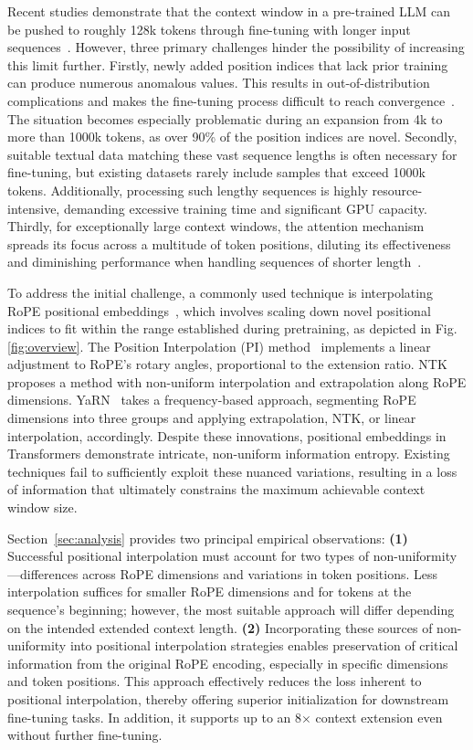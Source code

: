 Recent studies demonstrate that the context window in a pre-trained LLM can be pushed to roughly 128k tokens through fine-tuning with longer input sequences~\cite{longlora,pi,yarn,zhang2024soaring,liu2023scaling}. However, three primary challenges hinder the possibility of increasing this limit further. Firstly, newly added position indices that lack prior training can produce numerous anomalous values. This results in out-of-distribution complications and makes the fine-tuning process difficult to reach convergence~\cite{pi}. The situation becomes especially problematic during an expansion from 4k to more than 1000k tokens, as over 90\% of the position indices are novel. Secondly, suitable textual data matching these vast sequence lengths is often necessary for fine-tuning, but existing datasets rarely include samples that exceed 1000k tokens. Additionally, processing such lengthy sequences is highly resource-intensive, demanding excessive training time and significant GPU capacity. Thirdly, for exceptionally large context windows, the attention mechanism spreads its focus across a multitude of token positions, diluting its effectiveness and diminishing performance when handling sequences of shorter length~\cite{pi}.

To address the initial challenge, a commonly used technique is interpolating RoPE positional embeddings~\cite{rope,pi}, which involves scaling down novel positional indices to fit within the range established during pretraining, as depicted in Fig.\ref{fig:overview}. The Position Interpolation (PI) method~\cite{pi} implements a linear adjustment to RoPE's rotary angles, proportional to the extension ratio. NTK~\cite{ntk,dynamicntk} proposes a method with non-uniform interpolation and extrapolation along RoPE dimensions. YaRN~\cite{yarn} takes a frequency-based approach, segmenting RoPE dimensions into three groups and applying extrapolation, NTK, or linear interpolation, accordingly. Despite these innovations, positional embeddings in Transformers demonstrate intricate, non-uniform information entropy. Existing techniques fail to sufficiently exploit these nuanced variations, resulting in a loss of information that ultimately constrains the maximum achievable context window size.

Section~\ref{sec:analysis} provides two principal empirical observations: \textbf{(1)} Successful positional interpolation must account for two types of non-uniformity—differences across RoPE dimensions and variations in token positions. Less interpolation suffices for smaller RoPE dimensions and for tokens at the sequence’s beginning; however, the most suitable approach will differ depending on the intended extended context length.
\textbf{(2)} Incorporating these sources of non-uniformity into positional interpolation strategies enables preservation of critical information from the original RoPE encoding, especially in specific dimensions and token positions. This approach effectively reduces the loss inherent to positional interpolation, thereby offering superior initialization for downstream fine-tuning tasks. In addition, it supports up to an 8$\times$ context extension even without further fine-tuning.

